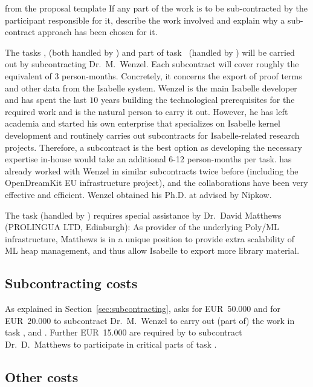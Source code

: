 \begin{todo}{from the proposal template}
  If any part of the work is to be sub-contracted by the participant responsible for it,
  describe the work involved and explain why a sub-contract approach has been chosen for
  it.
\end{todo}

The tasks ,
 (both handled by ) and part of
task~ (handled by ) will
be carried out by subcontracting Dr.\ M.\ Wenzel.  Each subcontract
will cover roughly the equivalent of $3$ person-months.  Concretely,
it concerns the export of proof terms and other data from the Isabelle
system.  Wenzel is the main Isabelle developer and has spent the
last $10$ years building the technological prerequisites for the
required work and is the natural person to carry it out.  However, he
has left academia and started his own enterprise that specializes on
Isabelle kernel development and routinely carries out subcontracts for
Isabelle-related research projects.  Therefore, a subcontract is the
best option as developing the necessary expertise in-house would take
an additional 6-12 person-months per task.   has already worked with
Wenzel in similar subcontracts twice before (including the
OpenDreamKit EU infrastructure project), and the collaborations have
been very effective and efficient. Wenzel obtained his Ph.D. at
 advised by Nipkow.

The task  (handled by )
requires special assistance by Dr.\ David Matthews (PROLINGUA LTD,
Edinburgh): As provider of the underlying Poly/ML infrastructure,
Matthews is in a unique position to provide extra scalability of ML
heap management, and thus allow Isabelle to export more library
material.

\subsection{Subcontracting costs}\label{sec:subcontracting-costs}

As explained in Section~\ref{sec:subcontracting},  asks for
EUR~50.000 and  for EUR~20.000 to subcontract Dr.\ M.\ Wenzel to
carry out (part of) the work in task
,  and
. Further EUR~15.000 are required
by  to subcontract Dr.\ D.\ Matthews to participate in
critical parts of task .

\subsection{Other costs}


